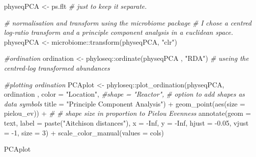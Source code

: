 \documentclass[
]{book}
\newenvironment{Shaded}{\begin{snugshade}}{\end{snugshade}}
\newcommand{\AttributeTok}[1]{\textcolor[rgb]{0.77,0.63,0.00}{#1}}
\newcommand{\CommentTok}[1]{\textcolor[rgb]{0.56,0.35,0.01}{\textit{#1}}}
\newcommand{\ConstantTok}[1]{\textcolor[rgb]{0.00,0.00,0.00}{#1}}
\newcommand{\DecValTok}[1]{\textcolor[rgb]{0.00,0.00,0.81}{#1}}
\newcommand{\FloatTok}[1]{\textcolor[rgb]{0.00,0.00,0.81}{#1}}
\newcommand{\FunctionTok}[1]{\textcolor[rgb]{0.00,0.00,0.00}{#1}}
\newcommand{\NormalTok}[1]{#1}
\newcommand{\OtherTok}[1]{\textcolor[rgb]{0.56,0.35,0.01}{#1}}
\newcommand{\SpecialCharTok}[1]{\textcolor[rgb]{0.00,0.00,0.00}{#1}}
\newcommand{\StringTok}[1]{\textcolor[rgb]{0.31,0.60,0.02}{#1}}
\begin{document}
\begin{Shaded}
\begin{Highlighting}[]
\NormalTok{physeqPCA }\OtherTok{\textless{}{-}}\NormalTok{  ps.flt  }\CommentTok{\# just to keep it separate.}

\CommentTok{\# normalisation and transform using the microbiome package}
\CommentTok{\# I chose a centred log{-}ratio transform and a principle component analysis in a euclidean space.}
\NormalTok{physeqPCA }\OtherTok{\textless{}{-}}\NormalTok{ microbiome}\SpecialCharTok{::}\FunctionTok{transform}\NormalTok{(physeqPCA, }\StringTok{"clr"}\NormalTok{)}

\CommentTok{\#ordination}
\NormalTok{ordination }\OtherTok{\textless{}{-}}\NormalTok{ phyloseq}\SpecialCharTok{::}\FunctionTok{ordinate}\NormalTok{(physeqPCA , }\StringTok{"RDA"}\NormalTok{) }\CommentTok{\# useing the centred{-}log transformed abundances}

\CommentTok{\#plotting ordination}
\NormalTok{PCAplot }\OtherTok{\textless{}{-}}\NormalTok{ phyloseq}\SpecialCharTok{::}\FunctionTok{plot\_ordination}\NormalTok{(physeqPCA, }
\NormalTok{                                      ordination , }
                                      \AttributeTok{color =} \StringTok{"Location"}\NormalTok{, }
                                      \CommentTok{\#shape = "Reactor", }
                                     \CommentTok{\# option to add shapes as data symbols}
                                      \AttributeTok{title =} \StringTok{"Principle Component Analysis"}\NormalTok{) }\SpecialCharTok{+}
     \FunctionTok{geom\_point}\NormalTok{(}\FunctionTok{aes}\NormalTok{(}\AttributeTok{size =}\NormalTok{ pielou\_ev)) }\SpecialCharTok{+}    \CommentTok{\# \# shape size in proportion to Pielou Evenness}
    \FunctionTok{annotate}\NormalTok{(}\AttributeTok{geom =} \StringTok{\textquotesingle{}text\textquotesingle{}}\NormalTok{, }\AttributeTok{label =} \FunctionTok{paste}\NormalTok{(}\StringTok{"Aitchison distances"}\NormalTok{), }
             \AttributeTok{x =} \SpecialCharTok{{-}}\ConstantTok{Inf}\NormalTok{, }\AttributeTok{y =} \SpecialCharTok{{-}}\ConstantTok{Inf}\NormalTok{, }\AttributeTok{hjust =} \SpecialCharTok{{-}}\FloatTok{0.05}\NormalTok{, }\AttributeTok{vjust =} \SpecialCharTok{{-}}\DecValTok{1}\NormalTok{, }\AttributeTok{size =} \DecValTok{3}\NormalTok{)  }\SpecialCharTok{+} 
    \FunctionTok{scale\_color\_manual}\NormalTok{(}\AttributeTok{values =}\NormalTok{ cols)}

\NormalTok{PCAplot}
\end{Highlighting}
\end{Shaded}
\end{document}
